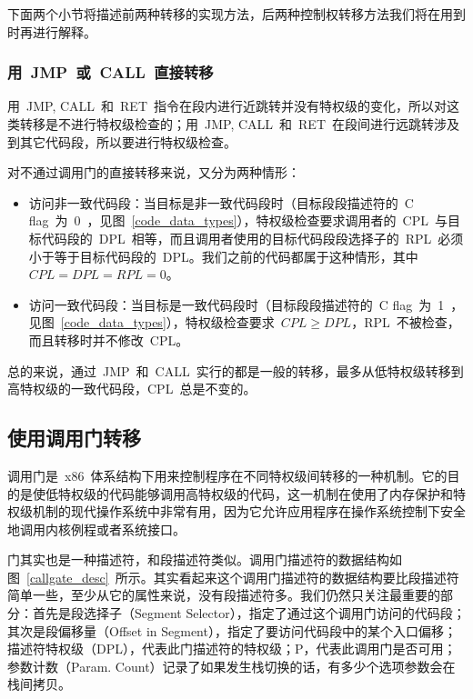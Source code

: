 下面两个小节将描述前两种转移的实现方法，后两种控制权转移方法我们将在用到时再进行解释。

\subsubsection{用~JMP~或~CALL~直接转移}

用~JMP, CALL~和~RET~指令在段内进行近跳转并没有特权级的变化，所以对这类转移是不进行特权级检查的；用~JMP, CALL~和~RET~在段间进行远跳转涉及到其它代码段，所以要进行特权级检查。

对不通过调用门的直接转移来说，又分为两种情形：

\begin{itemize}
\item{访问非一致代码段}：当目标是非一致代码段时（目标段段描述符的~C flag~为~0~，见图~\ref{code_data_types}），特权级检查要求调用者的~CPL~与目标代码段的~DPL~相等，而且调用者使用的目标代码段段选择子的~RPL~必须小于等于目标代码段的~DPL。我们之前的代码都属于这种情形，其中~$CPL=DPL=RPL=0$。
\item{访问一致代码段}：当目标是一致代码段时（目标段段描述符的~C flag~为~1~，见图~\ref{code_data_types}），特权级检查要求~$CPL \ge DPL$，RPL~不被检查，而且转移时并不修改~CPL。
\end{itemize}

总的来说，通过~JMP~和~CALL~实行的都是一般的转移，最多从低特权级转移到高特权级的一致代码段，CPL~总是不变的。

\subsection{使用调用门转移}\label{CHpm_callgate}

调用门是~x86~体系结构下用来控制程序在不同特权级间转移的一种机制。它的目的是使低特权级的代码能够调用高特权级的代码，这一机制在使用了内存保护和特权级机制的现代操作系统中非常有用，因为它允许应用程序在操作系统控制下安全地调用内核例程或者系统接口。


门其实也是一种描述符，和段描述符类似。调用门描述符的数据结构如图~\ref{callgate_desc}~所示。其实看起来这个调用门描述符的数据结构要比段描述符简单一些，至少从它的属性来说，没有段描述符多。我们仍然只关注最重要的部分：首先是段选择子（Segment Selector），指定了通过这个调用门访问的代码段；其次是段偏移量（Offset in Segment），指定了要访问代码段中的某个入口偏移；描述符特权级（DPL），代表此门描述符的特权级；P，代表此调用门是否可用；参数计数（Param. Count）记录了如果发生栈切换的话，有多少个选项参数会在栈间拷贝。

